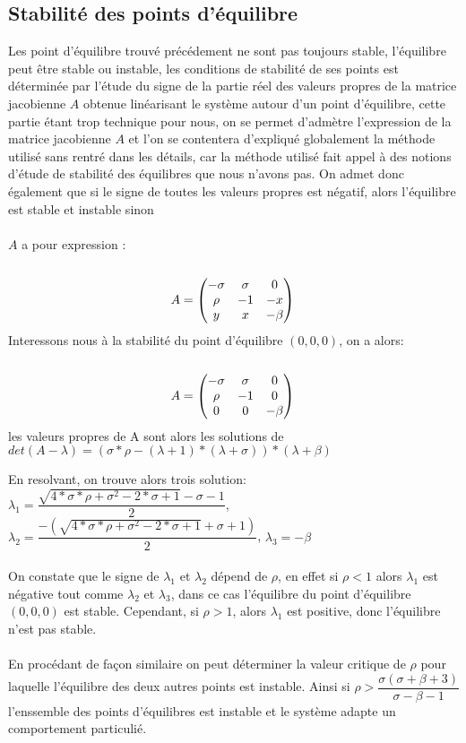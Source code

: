 \subsection{Stabilité des points d'équilibre}
Les point d'équilibre trouvé précédement ne sont pas toujours stable, l'équilibre peut être stable ou instable, les conditions de stabilité de ses points est déterminée par l'étude du signe de la partie réel des valeurs propres de la matrice jacobienne $A$ obtenue linéarisant le système autour d'un point d'équilibre, cette partie étant trop technique pour nous, on se permet d'admètre l'expression de la matrice jacobienne $A$ et l'on se contentera d'expliqué globalement la méthode utilisé sans rentré dans les détails, car la méthode utilisé fait appel à des notions d'étude de stabilité des équilibres que nous n'avons pas. On admet donc également que si le signe de toutes les valeurs propres est négatif, alors l'équilibre est stable et instable sinon \\\\ 
$A$ a pour expression :\\\\
$$A=
\begin{pmatrix}
    -\sigma & \sigma & 0\\
    \rho & -1 & -x\\
       y & x & -\beta 
\end{pmatrix}\\\\
$$
Interessons nous à la stabilité du point d'équilibre $(0,0,0)$, on a alors:\\\\
$$A=
\begin{pmatrix}
    -\sigma & \sigma & 0\\
    \rho & -1 & 0\\
       0 & 0 & -\beta 
\end{pmatrix}\\\\
$$
les valeurs propres de A sont alors les solutions de
 $det(A-\lambda)=(\sigma*\rho-(\lambda+1)*(\lambda+\sigma))*(\lambda+\beta) $

 En resolvant, on trouve alors trois solution: $\lambda_{1}=\dfrac{\sqrt{4*\sigma*\rho+\sigma^2-2*\sigma+1}-\sigma-1}{2}$, $\lambda_{2}=\dfrac{-(\sqrt{4*\sigma*\rho+\sigma^2-2*\sigma+1}+\sigma+1)}{2}$, $\lambda_{3}=-\beta$\\\\

 On constate que le signe de  $\lambda_{1}$ et $\lambda_{2}$ dépend de $\rho$, en effet si $\rho<1$ alors $\lambda_{1}$ est négative tout comme $\lambda_{2}$ et $\lambda_{3}$, dans ce cas l'équilibre du point d'équilibre $(0,0,0)$ est stable. Cependant, si $\rho>1$, alors $\lambda_{1}$ est positive, donc l'équilibre n'est pas stable.\\\\
 En procédant de façon similaire on peut déterminer la valeur critique de $\rho$ pour laquelle l'équilibre des deux autres points est instable. Ainsi si $\rho > \dfrac{\sigma(\sigma+\beta+3)}{\sigma-\beta-1}$ l'enssemble des points d'équilibres est instable et le système adapte un comportement particulié.
